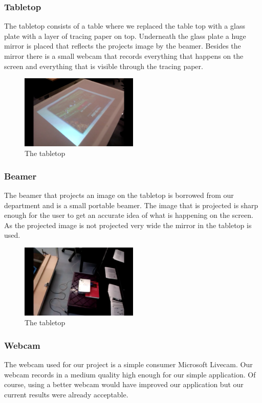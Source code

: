 \documentclass[a4paper,10pt]{report}
\begin{document}
		\subsubsection{Tabletop}
		The tabletop consists of a table where we replaced the table top with a glass plate with a layer of tracing paper on top.
		Underneath the glass plate a huge mirror is placed that reflects the projects image by the beamer. 
		Besides the mirror there is a small webcam that records everything that happens on the screen and everything that is visible through the tracing paper. 

		\begin{figure}[h!]
		\caption{The tabletop}
		\centering
		\includegraphics[width=0.5\textwidth]{images/tabletop}
		\end{figure}

		\subsubsection{Beamer}
		The beamer that projects an image on the tabletop is borrowed from our department and is a small portable beamer.
		The image that is projected is sharp enough for the user to get an accurate idea of what is happening on the screen. 
		As the projected image is not projected very wide the mirror in the tabletop is used. 

		\begin{figure}[h!]
		\caption{The tabletop}
		\centering
		\includegraphics[width=0.5\textwidth]{images/beamer}
		\end{figure}

		\subsubsection{Webcam}
		The webcam used for our project is a simple consumer Microsoft Livecam. 
		Our webcam records in a medium quality high enough for our simple application. 
		Of course, using a better webcam would have improved our application but our current results were already acceptable. 
\end{document}
